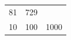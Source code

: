 {\begin{tabular}[t]{|l|l|l|}
        81 &
        729%
     \tabularnewline\cline{1-1}\cline{2-2}\cline{3-3}
        10 &
        100 &
        1000%
     \tabularnewline\cline{1-1}\cline{2-2}\cline{3-3}
    \end{tabular}} %
        \addtolength{\mytableboxheight}{\mytableboxdepth}
